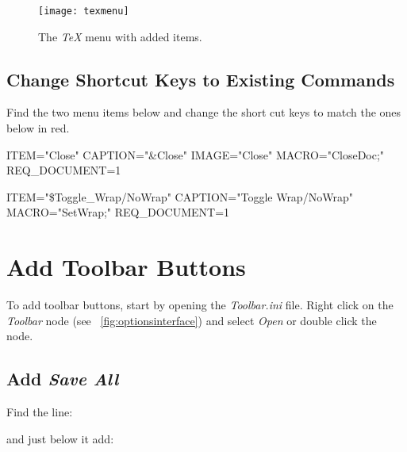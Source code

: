 \begin{figure}
	\centering
	\texttt{[image: texmenu]}
	\caption[The \textit{TeX} menu with added items]{The \textit{TeX} menu with added items.}
	\label{fig:texmenu}
\end{figure}

\subsection{Change Shortcut Keys to Existing Commands}
Find the two menu items below and change the short cut keys to match the ones below in red.

\begin{code}[\codenumbering]{}
	\codeitemnonumber ITEM="Close"
	    \stepcodelevel{}
	    \codeitemnonumber CAPTION="\&Close"
	    \codeitemnonumber IMAGE="Close"
	    \codeitemnonumber MACRO="CloseDoc;"
	    \codeitemnonumber {}
	    \codeitemnonumber REQ\_DOCUMENT=1
\end{code}

\begin{code}[\codenumbering]{}
	\codeitemnonumber ITEM="\$Toggle\_Wrap/NoWrap"
		\stepcodelevel{}
	    \codeitemnonumber CAPTION="Toggle Wrap/NoWrap"
	    \codeitemnonumber MACRO="SetWrap;"
	    \codeitemnonumber {}
	    \codeitemnonumber REQ\_DOCUMENT=1
\end{code}

\section{Add Toolbar Buttons}
To add toolbar buttons, start by opening the \emph{Toolbar.ini} file.  Right click on the \emph{Toolbar} node (see \figurename~\ref{fig:optionsinterface}) and select \emph{Open} or double click the node.

\subsection{Add \textit{Save All}}
Find the line:
\begin{plainlist}
	\item {}
\end{plainlist}

and just below it add:
\begin{plainlist}
	\item {}
\end{plainlist}

